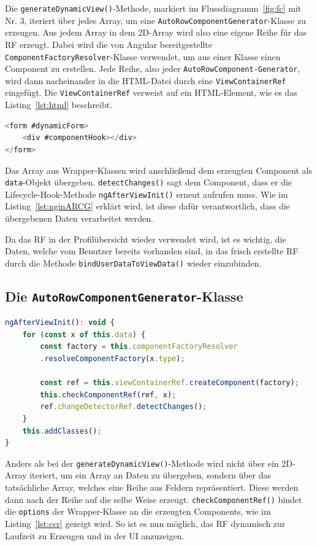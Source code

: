 Die \texttt{generateDynamicView()}-Methode, markiert im Flussdiagramm~\ref{fig:fc} mit Nr. 3, iteriert über jedes Array, um eine \texttt{AutoRowComponentGenerator}-Klasse zu erzeugen. Aus jedem Array in dem 2D-Array wird also eine eigene Reihe für das RF erzeugt. Dabei wird die von Angular bereitgestellte \texttt{ComponentFactoryResolver}-Klasse verwendet, um aus einer Klasse einen Component zu erstellen. 
Jede Reihe, also jeder \texttt{AutoRowComponent-Generator}, wird dann nacheinander in die HTML-Datei durch eine \texttt{ViewContainerRef} eingefügt. Die \texttt{ViewContainerRef} verweist auf ein HTML-Element, wie es das Listing~\ref{lst:html} beschreibt.

\begin{lstlisting}[caption={ViewContainerRef verweist auf \#componentHook}, language=JavaScript,label={lst:html}]
<form #dynamicForm>
	<div #componentHook></div>
</form>
\end{lstlisting}

Das Array aus Wrapper-Klassen wird anschließend dem erzeugten Component als \texttt{data}-Objekt übergeben. \texttt{detectChanges()} sagt dem Component, dass er die Lifecycle-Hook-Methode \texttt{ngAfterViewInit()} erneut aufrufen muss. Wie im Listing~\ref{lst:nginARCG} erklärt wird, ist diese dafür verantwortlich, dass die übergebenen Daten verarbeitet werden.

Da das RF in der Profilübersicht wieder verwendet wird, ist es wichtig, die Daten, welche vom Benutzer bereits vorhanden sind, in das frisch erstellte RF durch die Methode \texttt{bindUserDataToViewData()} wieder einzubinden.

\subsection{Die \texttt{AutoRowComponentGenerator}-Klasse}

\begin{lstlisting}[caption={Die \texttt{ngAfterViewInit()}-Methode der \texttt{AutoRowComponentGenerator}-Klasse}, language=JavaScript,label={lst:nginARCG}]
ngAfterViewInit(): void {
	for (const x of this.data) {
		const factory = this.componentFactoryResolver
		.resolveComponentFactory(x.type);
		
		const ref = this.viewContainerRef.createComponent(factory);
		this.checkComponentRef(ref, x);
		ref.changeDetectorRef.detectChanges();
	}
	this.addClasses();
}
\end{lstlisting}

Anders als bei der \texttt{generateDynamicView()}-Methode wird nicht über ein 2D-Array iteriert, um ein Array an Daten zu übergeben, sondern über das tatsächliche Array, welches eine Reihe aus Feldern repräsentiert. Diese werden dann nach der Reihe auf die selbe Weise erzeugt. \texttt{checkComponentRef()} bindet die \texttt{options} der Wrapper-Klasse an die erzeugten Components, wie im Listing~\ref{lst:ccr} gezeigt wird. So ist es nun möglich, das RF dynamisch zur Laufzeit zu Erzeugen und in der UI anzuzeigen.

